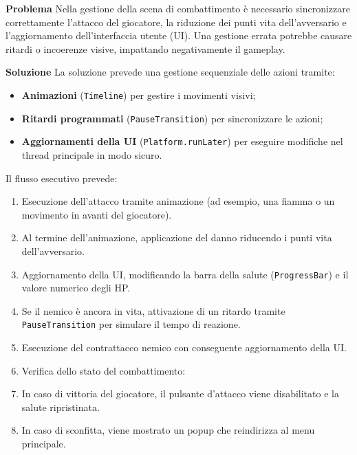 \documentclass[a4paper,12pt]{report}
\begin{document}
\textbf{Problema}\newline
Nella gestione della scena di combattimento è necessario sincronizzare correttamente l'attacco del giocatore, la riduzione dei punti vita dell'avversario e l'aggiornamento dell'interfaccia utente (UI). Una gestione errata potrebbe causare ritardi o incoerenze visive, impattando negativamente il gameplay.
  
\textbf{Soluzione}\newline
La soluzione prevede una gestione sequenziale delle azioni tramite:
\begin{itemize}
    \item \textbf{Animazioni} (\texttt{Timeline}) per gestire i movimenti visivi;
    \item \textbf{Ritardi programmati} (\texttt{PauseTransition}) per sincronizzare le azioni;
    \item \textbf{Aggiornamenti della UI} (\texttt{Platform.runLater}) per eseguire modifiche nel thread principale in modo sicuro.
\end{itemize}

Il flusso esecutivo prevede:
\begin{enumerate}
    \item Esecuzione dell’attacco tramite animazione (ad esempio, una fiamma o un movimento in avanti del giocatore).
    \item Al termine dell’animazione, applicazione del danno riducendo i punti vita dell’avversario.
    \item Aggiornamento della UI, modificando la barra della salute (\texttt{ProgressBar}) e il valore numerico degli HP.
    \item Se il nemico è ancora in vita, attivazione di un ritardo tramite \texttt{PauseTransition} per simulare il tempo di reazione.
    \item Esecuzione del contrattacco nemico con conseguente aggiornamento della UI.
    \item Verifica dello stato del combattimento:
    \item In caso di vittoria del giocatore, il pulsante d'attacco viene disabilitato e la salute ripristinata.
    \item In caso di sconfitta, viene mostrato un popup che reindirizza al menu principale.
\end{enumerate}
\end{document}
